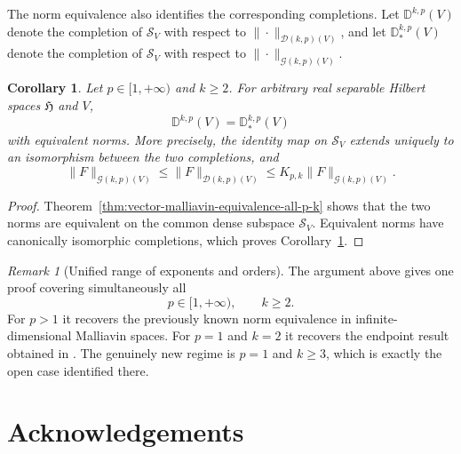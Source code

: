 \documentclass[12pt]{article}
\theoremstyle{plain}
\newtheorem{corollary}[theorem]{Corollary}
\theoremstyle{definition}
\theoremstyle{remark}
\newtheorem{remark}[theorem]{Remark}
\numberwithin{equation}{section}
\begin{document}
The norm equivalence also identifies the corresponding completions.  Let $\mathbb{D}^{k,p}(V)$ denote the completion of $\mathcal{S}_{V}$ with respect to $\|\cdot\|_{\mathcal{D}(k,p)(V)}$, and let $\mathbb{D}_{*}^{k,p}(V)$ denote the completion of $\mathcal{S}_{V}$ with respect to $\|\cdot\|_{\mathcal{G}(k,p)(V)}$.

\begin{corollary}
	\label{cor:malliavin-domains-coincide-all-p-k}
	Let $p\in[1,+\infty)$ and $k\geqslant2$.  For arbitrary real separable Hilbert spaces $\mathfrak{H}$ and $V$,
	$$
	\mathbb{D}^{k,p}(V)=\mathbb{D}_{*}^{k,p}(V)
	$$
	with equivalent norms.  More precisely, the identity map on $\mathcal{S}_{V}$ extends uniquely to an isomorphism between the two completions, and
	$$
	\|F\|_{\mathcal{G}(k,p)(V)}
	\leqslant
	\|F\|_{\mathcal{D}(k,p)(V)}
	\leqslant
	K_{p,k}\|F\|_{\mathcal{G}(k,p)(V)}.
	$$
\end{corollary}

\begin{proof}
	Theorem~\ref{thm:vector-malliavin-equivalence-all-p-k} shows that the two norms are equivalent on the common dense subspace $\mathcal{S}_{V}$.  Equivalent norms have canonically isomorphic completions, which proves Corollary~\ref{cor:malliavin-domains-coincide-all-p-k}.
\end{proof}

\begin{remark}[Unified range of exponents and orders]
	The argument above gives one proof covering simultaneously all
	$$
	p\in[1,+\infty),\qquad k\geqslant2.
	$$
	For $p>1$ it recovers the previously known norm equivalence in infinite-dimensional Malliavin spaces.  For $p=1$ and $k=2$ it recovers the endpoint result obtained in \cite{AddonaMuratoriRossi}.  The genuinely new regime is $p=1$ and $k\geqslant3$, which is exactly the open case identified there.
\end{remark}


\section*{Acknowledgements}
\end{document}
